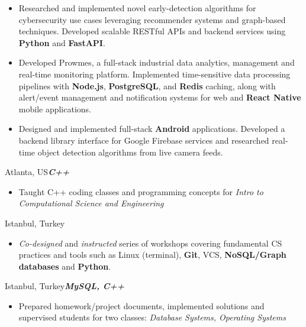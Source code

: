 \documentclass[11pt,letterpaper,sans]{moderncv}
\begin{document}
    {}{
        \begin{itemize}
        \item Researched and implemented novel early-detection algorithms for cybersecurity
        use cases leveraging recommender systems and graph-based techniques. Developed
        scalable RESTful APIs and backend services using \textbf{Python} and \textbf{FastAPI}.
        \end{itemize}
    }
    {}{
        \begin{itemize}
        \item Developed Prowmes, a full-stack industrial data analytics, management and
        real-time monitoring platform. Implemented time-sensitive data processing pipelines
        with \textbf{Node.js}, \textbf{PostgreSQL}, and \textbf{Redis} caching, along with
        alert/event management and notification systems for web and \textbf{React Native}
        mobile applications.
        \end{itemize}
    }
    {}{
        \begin{itemize}
        \item Designed and implemented full-stack \textbf{Android} applications. Developed
        a backend library interface for Google Firebase services and researched real-time
        object detection algorithms from live camera feeds.
        \end{itemize}
    }

	{Atlanta, US}{\footnotesize{\textbf{\emph{C++}}}}{
		\begin{itemize}
		\item Taught C++ coding classes and programming concepts for \textit{Intro to
        Computational Science and Engineering}
		\end{itemize}			
	}
    {Istanbul, Turkey}{}{
        \begin{itemize}
        \item \textit{Co-designed} and \textit{instructed} series of workshops covering
        fundamental CS practices and tools such as Linux (terminal), \textbf{Git}, VCS,
        \textbf{NoSQL/Graph databases} and \textbf{Python}. 
        \end{itemize}
    }
    {Istanbul, Turkey}{\footnotesize{\textbf{\emph{MySQL, C++}}}}{
        \begin{itemize}
        \item Prepared homework/project documents, implemented solutions and supervised students
        for two classes: \textit{Database Systems, Operating Systems}
        \end{itemize}
    }
\end{document}
